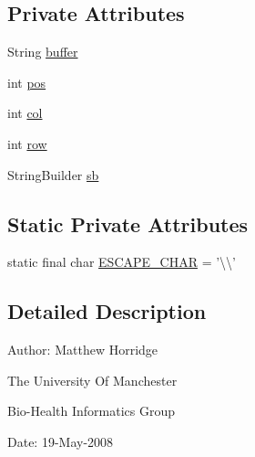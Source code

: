 \subsection*{Private Attributes}
\begin{DoxyCompactItemize}
\item 
String \hyperlink{classorg_1_1coode_1_1owlapi_1_1manchesterowlsyntax_1_1_manchester_o_w_l_syntax_tokenizer_ab7d953c443c5bb870ffd378bb37fb230}{buffer}
\item 
int \hyperlink{classorg_1_1coode_1_1owlapi_1_1manchesterowlsyntax_1_1_manchester_o_w_l_syntax_tokenizer_ac5897a7d0c8d377780dc214e3ba4cfa6}{pos}
\item 
int \hyperlink{classorg_1_1coode_1_1owlapi_1_1manchesterowlsyntax_1_1_manchester_o_w_l_syntax_tokenizer_a30a7cd2d693d53373f91f5aacab7e176}{col}
\item 
int \hyperlink{classorg_1_1coode_1_1owlapi_1_1manchesterowlsyntax_1_1_manchester_o_w_l_syntax_tokenizer_ab04e063b75cba2217791b30e1b6a4226}{row}
\item 
String\-Builder \hyperlink{classorg_1_1coode_1_1owlapi_1_1manchesterowlsyntax_1_1_manchester_o_w_l_syntax_tokenizer_a158215089bcc0dc4f05ff959993f0852}{sb}
\end{DoxyCompactItemize}
\subsection*{Static Private Attributes}
\begin{DoxyCompactItemize}
\item 
static final char \hyperlink{classorg_1_1coode_1_1owlapi_1_1manchesterowlsyntax_1_1_manchester_o_w_l_syntax_tokenizer_a3471def2dcfb2dcffe163eb6c06edc39}{E\-S\-C\-A\-P\-E\-\_\-\-C\-H\-A\-R} = '\textbackslash{}\textbackslash{}'
\end{DoxyCompactItemize}


\subsection{Detailed Description}
Author\-: Matthew Horridge\par
 The University Of Manchester\par
 Bio-\/\-Health Informatics Group\par
 Date\-: 19-\/\-May-\/2008\par
 \par
 

